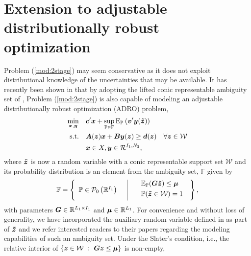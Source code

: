 \documentclass[fleqn,orsc,blindrev]{informs4}
\newcommand {\Ep}[2]{{\mathrm{E}_{\mathbb{P}_{#1}} \left( #2 \right)}}
\newcommand {\supEp}[1]{\displaystyle \sup_{\mathbb{P} \in \mathbb{F}} \Ep{}{#1}}
\newcommand{\mb}[1]{\mbox{\boldmath \ensuremath{#1}}}
\newcommand{\mbt}[1]{\mb{\tilde{#1}}}
\renewcommand{\Re}{\mathbb{R}}
\begin{document}
		
		\section{Extension to adjustable distributionally robust optimization} \label{sec:ADRO}
Problem (\ref{mod:2stage}) may seem conservative as it does not exploit distributional knowledge of the uncertainties that may be available. It has recently been shown  in \cite{bsz17} that by adopting the lifted conic representable ambiguity set of  \cite{wks14},  Problem (\ref{mod:2stage}) is also capable of modeling an adjustable distributionally robust optimization (ADRO) problem,    
\begin{equation} \label{mod:d2stage}
			\begin{aligned}
				\min_{\boldsymbol{x}, \boldsymbol{y}} \quad & \mb{c}' \mb{x} + \supEp{  \mb{v}'\mb{y}(\mbt{z} )} \\
				{\rm s.t.}\quad &   \mb{A}(\mb{z})\mb{x}+\mb{B}\mb{y}(\mb{z}) \ge \mb{d}(\mb{z}) & \forall \mb{z} \in \mathcal{W}\\
				&\mb{x} \in X, \mb{y}\in \mathcal{R}^{I_1,N_2},
			\end{aligned}
\end{equation}
		where $\mbt{z}$ is now a random variable with a conic representable support set $\mathcal{W}$ and its probability distribution is an element from the ambiguity set, $\mathbb{F}$ given by 
\begin{equation*}
			\mathbb{F}=\left\{
			\begin{array}{lll}
				\mathbb{P}\in\mathcal{P}_{0}\left(\Re^{I_{1}}\right) \enskip & $\vline$ & \enskip
				\begin{array}{l}
					\mathbb{E}_{\mathbb{P}}(\mb{G}\mbt{z}) \leq \mb{\mu} \vspace{3pt}\\
					\mathbb{P}(\mbt{z}\in\mathcal{W})=1 \vspace{3pt}
				\end{array}
			\end{array}
			\right\},
\end{equation*}
		with  parameters $\mb{G} \in \Re^{L_1 \times I_1}$ and $\mb{\mu} \in \Re^{L_1}$. 
		For convenience and without loss of generality, we have incorporated the auxiliary random variable defined in  \cite{bsz17,wks14} as part of  $\mbt{z}$ and we refer interested readers to their papers regarding the modeling capabilities of such an  ambiguity set. Under the Slater's condition, i.e., the relative interior of $\{ \mb{z} \in \mathcal{W}~:~ \mb{G}\mb{z} \leq \mb{\mu}\}$ is non-empty, 
\end{document}
